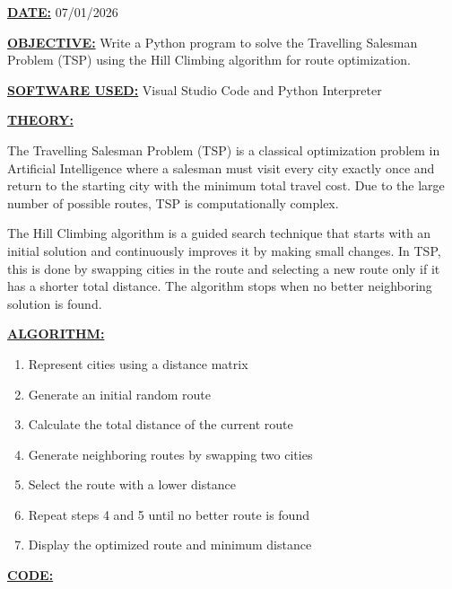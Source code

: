 \documentclass[12pt,a4paper]{article}
\begin{document}
\textbf{\underline{DATE:}} 07/01/2026

\vspace{0.5cm}
\textbf{\underline{OBJECTIVE:}} Write a Python program to solve the Travelling Salesman Problem (TSP) using the Hill Climbing algorithm for route optimization.

\vspace{0.5cm}
\textbf{\underline{SOFTWARE USED:}} Visual Studio Code and Python Interpreter

\vspace{0.5cm}
\textbf{\underline{THEORY:}}

The Travelling Salesman Problem (TSP) is a classical optimization problem in Artificial Intelligence where a salesman must visit every city exactly once and return to the starting city with the minimum total travel cost. Due to the large number of possible routes, TSP is computationally complex.

The Hill Climbing algorithm is a guided search technique that starts with an initial solution and continuously improves it by making small changes. In TSP, this is done by swapping cities in the route and selecting a new route only if it has a shorter total distance. The algorithm stops when no better neighboring solution is found.

\vspace{0.5cm}
\textbf{\underline{ALGORITHM:}}
\begin{enumerate}
  \item Represent cities using a distance matrix
  \item Generate an initial random route
  \item Calculate the total distance of the current route
  \item Generate neighboring routes by swapping two cities
  \item Select the route with a lower distance
  \item Repeat steps 4 and 5 until no better route is found
  \item Display the optimized route and minimum distance
\end{enumerate}

\vspace{0.5cm}
\textbf{\underline{CODE:}}
\end{document}

